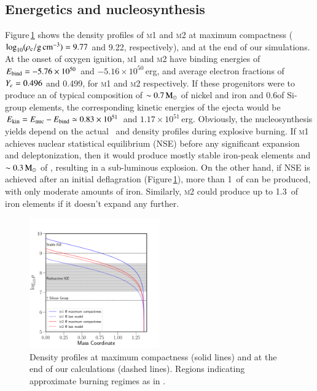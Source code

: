 \documentclass{aa}
\begin{document}
\subsection{Energetics and nucleosynthesis}\label{sec:3}
Figure\,\ref{fig:nuc} shows the density profiles of \textsc{m1} and \textsc{m2} at maximum compactness ($\log_{10} (\rho_{\mathrm{c}}/ \mathrm{g\,cm^{-3}})=9.77$ and 9.22, respectively), and at the end of our simulations. At the onset of oxygen ignition, \textsc{m1} and \textsc{m2} have binding energies of $E_{\rm bind}=-5.76\times10^{50}$ and $-5.16\times10^{50}$\,erg, and average electron fractions of $Y_e= 0.496$ and  0.499, for \textsc{m1} and \textsc{m2} respectively. If these progenitors were to produce an \ia of  typical composition of $\sim 0.7\mathrm{\,M_\odot}$ of nickel and iron and 0.6\msun of Si-group elements, the corresponding kinetic energies of the ejecta would be $E_{\rm kin}=E_{\rm nuc}-E_{\rm bind}\simeq 0.83\times10^{51}$ and  $1.17\times10^{51}$\,erg. 
Obviously, the nucleosynthesis yields depend on the actual
\ye\ and density profiles during explosive burning. If 
\textsc{m1} achieves nuclear statistical equilibrium (NSE)
before any significant expansion and deleptonization, then it
would produce mostly stable iron-peak elements and $\sim 0.3\mathrm{\,M_\odot}$ of , resulting in a sub-luminous 
explosion. On the other hand, if NSE is achieved after an 
initial deflagration (Figure\,\ref{fig:nuc}), more than 
1\msun\ of  can be produced, with only moderate
amounts of iron. Similarly, \textsc{m2} could produce up 
to 1.3\msun\ of iron elements if it doesn't expand any 
further. 

\begin{figure}
\begin{center}
\includegraphics[width=0.5\textwidth]{composition.pdf}
\caption{Density profiles at maximum compactness (solid lines) and at the end of our \mesa calculations (dashed lines). Regions indicating approximate burning regimes as in \cite{Seitenzahl2017}.}
\label{fig:nuc}
\end{center}
\end{figure}
\end{document}
